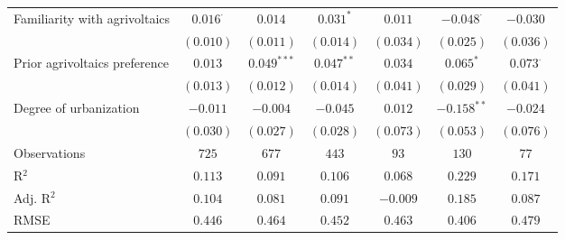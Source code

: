 \begin{center}
\begin{small}
\begin{longtable}{l@{} c@{} c@{} c@{} c@{} c@{} c@{}}
\quad Familiarity with agrivoltaics & $0.016^{\cdot}$ & $0.014$        & $0.031^{*}$    & $0.011$   & $-0.048^{\cdot}$ & $-0.030$         \\
                                    & $(0.010)$       & $(0.011)$      & $(0.014)$      & $(0.034)$ & $(0.025)$        & $(0.036)$        \\
\quad Prior agrivoltaics preference & $0.013$         & $0.049^{***}$  & $0.047^{**}$   & $0.034$   & $0.065^{*}$      & $0.073^{\cdot}$  \\
                                    & $(0.013)$       & $(0.012)$      & $(0.014)$      & $(0.041)$ & $(0.029)$        & $(0.041)$        \\
\quad Degree of urbanization        & $-0.011$        & $-0.004$       & $-0.045$       & $0.012$   & $-0.158^{**}$    & $-0.024$         \\
                                    & $(0.030)$       & $(0.027)$      & $(0.028)$      & $(0.073)$ & $(0.053)$        & $(0.076)$        \\
\hline
Observations                        & $725$           & $677$          & $443$          & $93$      & $130$            & $77$             \\
R$^2$                               & $0.113$         & $0.091$        & $0.106$        & $0.068$   & $0.229$          & $0.171$          \\
Adj. R$^2$                          & $0.104$         & $0.081$        & $0.091$        & $-0.009$  & $0.185$          & $0.087$          \\
RMSE                                & $0.446$         & $0.464$        & $0.452$        & $0.463$   & $0.406$          & $0.479$          \\
\end{longtable}
\end{small}
\end{center}
